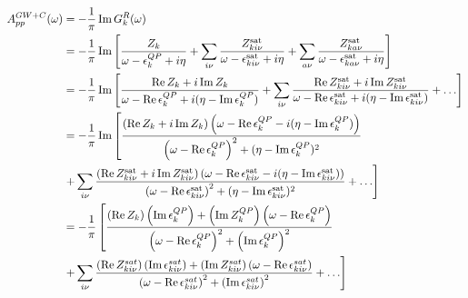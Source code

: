 \begin{align}
    A_{pp}^{GW+C}(\omega )&= -\frac{1}{\pi} \operatorname{Im} G_k^R(\omega)\\
&=-\frac{1}{\pi} \operatorname{Im} \left[ \frac{Z_k}{\omega - \epsilon_k^{QP} + i\eta} + \sum_{i\nu} \frac{Z^{\text{sat}}_{ki\nu}}{\omega - \epsilon^{\text{sat}}_{ki\nu} + i\eta} + \sum_{a\nu} \frac{Z^{\text{sat}}_{ka\nu}}{\omega - \epsilon^{\text{sat}}_{ka\nu} + i\eta}\right] \\
&=-\frac{1}{\pi} \operatorname{Im} \left[ \frac{\operatorname{Re} Z_k + i \operatorname{Im} Z_k}{\omega - \operatorname{Re} \epsilon_k^{QP} + i (\eta - \operatorname{Im} \epsilon_k^{QP})} + \sum_{i\nu} \frac{\operatorname{Re} Z^{\text{sat}}_{ki\nu} + i \operatorname{Im} Z^{\text{sat}}_{ki\nu}}{\omega - \operatorname{Re} \epsilon^{\text{sat}}_{ki\nu} + i (\eta - \operatorname{Im} \epsilon^{\text{sat}}_{ki\nu})} + \ldots\right] \\
&=-\frac{1}{\pi} \operatorname{Im} \left[ \frac{\left( \operatorname{Re} Z_k + i \operatorname{Im} Z_k \right) \left( \omega - \operatorname{Re} \epsilon_k^{QP} - i (\eta - \operatorname{Im} \epsilon_k^{QP})\right)}{\left(\omega - \operatorname{Re} \epsilon_k^{QP}\right)^2 + (\eta - \operatorname{Im} \epsilon_k^{QP})^2} \right. \notag \\
&\left. + \sum_{i\nu} \frac{\left( \operatorname{Re} Z^{\text{sat}}_{ki\nu} + i \operatorname{Im} Z^{\text{sat}}_{ki\nu} \right) \left( \omega - \operatorname{Re} \epsilon^{\text{sat}}_{ki\nu} - i (\eta - \operatorname{Im} \epsilon^{\text{sat}}_{ki\nu})\right)}{\left(\omega - \operatorname{Re} \epsilon^{\text{sat}}_{ki\nu}\right)^2 + (\eta - \operatorname{Im} \epsilon^{\text{sat}}_{ki\nu})^2} + \ldots \right]\\
& = -\frac{1}{\pi}\left[\frac{\left(\operatorname{Re} Z_k\right)\left(\operatorname{Im} \epsilon_k^{QP}\right) + \left(\operatorname{Im} Z_k^{QP}\right)\left(\omega - \operatorname{Re} \epsilon_k^{QP}\right)}{\left(\omega - \operatorname{Re} \epsilon_k^{QP}\right)^2 + \left(\operatorname{Im} \epsilon_k^{QP}\right)^2}\right.\\
& \left. + \sum_{i\nu} \frac{\left(\operatorname{Re} Z_{ki\nu}^{sat}\right)\left(\operatorname{Im} \epsilon_{ki\nu}^{sat}\right) + \left(\operatorname{Im} Z_{ki\nu}^{sat}\right)\left(\omega - \operatorname{Re} \epsilon_{ki\nu}^{sat}\right)}{\left(\omega - \operatorname{Re} \epsilon_{ki\nu}^{sat}\right)^2 + \left(\operatorname{Im} \epsilon_{ki\nu}^{sat}\right)^2} + \ldots \right]
\end{align}

